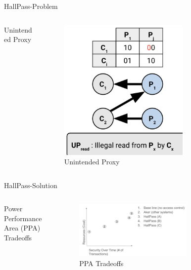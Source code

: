 \begin{frame}{HallPass-Problem}
    \begin{columns}
        \begin{column}{0.5\textwidth}
            Unintended Proxy
        \end{column}
        \begin{column}{0.5\textwidth}
            \begin{figure}
            \centering
            \includegraphics[height=0.7\textheight,width=0.7\textwidth,keepaspectratio]{proxy.png}
            \caption{Unintended Proxy}
        \end{figure}
        \end{column}
    \end{columns}
\end{frame}

\begin{frame}{HallPass-Solution}
    \begin{columns}
        \begin{column}{0.5\textwidth}
        Power Performance Area (PPA) Tradeoffs
        \end{column}
        \begin{column}{0.5\textwidth}
            \begin{figure}
            \centering
            \includegraphics[height=0.7\textheight,width=0.7\textwidth,keepaspectratio]{tradeoffs.png}
            \caption{PPA Tradeoffs}
            \end{figure}
        \end{column}
    \end{columns}
\end{frame}

